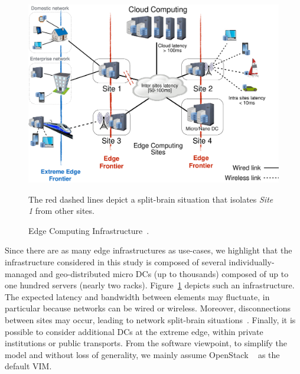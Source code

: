 \begin{figure}[t]
  \centering
  \includegraphics[width=.95\columnwidth]{./figures/figure_fog.pdf}
    \vspace*{-.2cm}
  \caption{Edge Computing Infrastructure~\cite{7923796}.}
    {\small The red dashed lines depict a split-brain situation that isolates
    \emph{Site 1} from other sites.}
  \label{fig:fogedge-archi}
  \vspace*{-.3cm}
\end{figure}

Since there are as many edge infrastructures as use-cases, we
highlight that the infrastructure considered in this
study is composed
 of several individually-managed and geo-distributed micro DCs (up to thousands)
composed of up to one hundred servers (nearly two racks).
Figure~\ref{fig:fogedge-archi} depicts such an infrastructure.
The expected latency and bandwidth between elements may fluctuate, in particular because
networks can be wired or wireless. Moreover, disconnections
between sites may occur, leading to network split-brain
situations~\cite{4456903}.
Finally, it is possible to consider additional DCs at the extreme edge, within private institutions or public transports.
%
From the software viewpoint, to simplify the model and
without loss of generality, we mainly assume OpenStack ~\cite{openstack:www} as the default VIM.  

